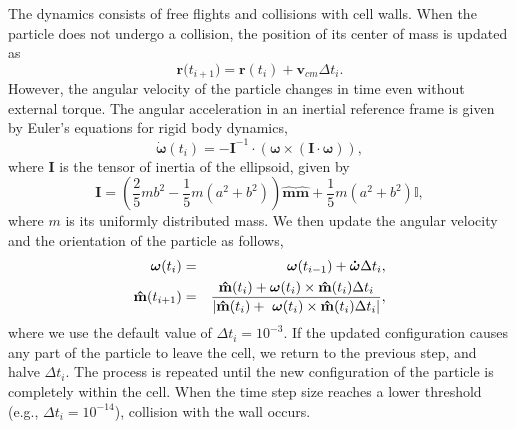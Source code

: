 \documentclass{article}
\begin{document}
The dynamics consists of free flights and collisions with cell walls. When
the particle does not undergo a collision, the position of its center of
mass is updated as 
\begin{equation}
\mathbf{r(}t_{i+1})=\mathbf{r}(t_{i})+\mathbf{v}_{cm}\Delta t_{i}.
\end{equation}%
However, the angular velocity of the particle changes in time even without
external torque. The angular acceleration in an inertial reference frame is
given by Euler's equations for rigid body dynamics,%
\begin{equation}
\dot{\boldsymbol{\omega }}(t_{i})=\mathbf{-I}^{-1}\cdot (\boldsymbol{\omega }%
\times (\mathbf{I}\cdot \boldsymbol{\omega })),
\end{equation}%
where $\mathbf{I}$ is the tensor of inertia of the ellipsoid, given by 
\begin{equation}
\mathbf{I}=(\frac{2}{5}mb^{2}-\frac{1}{5}m(a^{2}+b^{2}))\mathbf{\hat{m}\hat{m%
}}+\frac{1}{5}m(a^{2}+b^{2})\mathbb{I}\mathbf{,}
\end{equation}%
where $m$ is its uniformly distributed mass. We then update the angular
velocity and the orientation of the particle as follows, 
\begin{eqnarray}
\boldsymbol{\omega }(t_{i}) &=&\boldsymbol{\omega }(t_{i-1})+\boldsymbol{%
\dot{\omega}}\Delta t_{i}, \\
\mathbf{\hat{m}}(t_{i+1}) &=&\frac{\mathbf{\hat{m}}(t_{i})+\boldsymbol{%
\omega }(t_{i})\times \mathbf{\hat{m}}(t_{i})\Delta t_{i}}{|\mathbf{\hat{m}}%
(t_{i})+\boldsymbol{\ \omega }(t_{i})\times \mathbf{\hat{m}}(t_{i})\Delta
t_{i}|},
\end{eqnarray}%
where we use the default value of $\Delta t_{i}=10^{-3}$. If the updated
configuration causes any part of the particle to leave the cell, we return
to the previous step, and halve $\Delta t_{i}$. The process is repeated
until the new configuration of the particle is completely within the cell.
When the time step size reaches a lower threshold (e.g., $\Delta
t_{i}=10^{-14}$), collision with the wall occurs.
\end{document}

